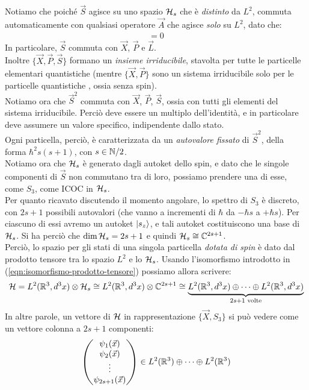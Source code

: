 \documentclass[../../FisicaTeorica.tex]{subfiles}
\begin{document}
Notiamo che poiché $\vec{S}$ agisce su uno spazio $\mathcal{H}_s$ che è \textit{distinto} da $L^2$, commuta automaticamente con qualsiasi operatore $\vec{A}$ che agisce \textit{solo} su $L^2$, dato che:
\begin{align*}
[\vec{A} \otimes \bb{I}, \bb{I}\otimes \vec{S}]=0
\end{align*}
In particolare, $\vec{S}$ commuta con $\vec{X}$, $\vec{P}$ e $\vec{L}$.\\
Inoltre $\{\vec{X}, \vec{P}, \vec{S}\}$ formano un \textit{insieme irriducibile}, stavolta per tutte le particelle elementari quantistiche (mentre $\{\vec{X},\vec{P}\}$ sono un sistema irriducibile solo per le particelle quantistiche , ossia senza spin).\\
Notiamo ora che $\vec{S}^2$ commuta con $\vec{X}$, $\vec{P}$, $\vec{S}$, ossia con tutti gli elementi del sistema irriducibile. Perciò deve essere un multiplo dell'identità, e in particolare deve assumere un valore specifico, indipendente dallo stato.\\
Ogni particella, perciò, è caratterizzata da un \textit{autovalore fissato} di $\vec{S}^2$, della forma $\hbar^2 s(s+1)$, con $s\in \mathbb{N}/2$.\\
Notiamo ora che $\mathcal{H}_s$ è generato dagli autoket dello spin, e dato che le singole componenti di $\vec{S}$ non commutano tra di loro, possiamo prendere una di esse, come $S_3$, come ICOC in $\mathcal{H}_s$.\\
Per quanto ricavato discutendo il momento angolare, lo spettro di $S_3$ è discreto, con $2s +1$ possibili autovalori (che vanno a incrementi di $\hbar$ da $-\hbar s$ a $+\hbar s$). Per ciascuno di essi avremo un autoket $\Ket{s_z}$, e tali autoket costituiscono una base di $\mathcal{H}_s$. Si ha perciò che $\operatorname{dim}\mathcal{H}_s = 2s+1$ e quindi $\mathcal{H}_s \cong \mathbb{C}^{2s+1}$.\\

Perciò, lo spazio  per gli stati di una singola particella \textit{dotata di spin} è dato dal prodotto tensore tra lo spazio  $L^2$ e lo  $\mathcal{H}_s$. Usando l'isomorfismo introdotto in (\ref{eqn:isomorfismo-prodotto-tensore}) possiamo allora scrivere:
\[
\mathcal{H} = L^2(\mathbb{R}^3, d^3x) \otimes \mathcal{H}_s \cong L^2(\mathbb{R}^3, d^3 x)\otimes \mathbb{C}^{2s+1} \cong \underbrace{L^2(\mathbb{R}^3, d^3x) \oplus \dots \oplus L^2(\mathbb{R}^3, d^3x)}_{2s+1 \text{ volte}}
\]
In altre parole, un vettore di $\mathcal{H}$ in rappresentazione $\{\vec{X}, S_3\}$ si può vedere come un vettore colonna a $2s+1$ componenti:
\[
\begin{pmatrix}
\psi_1(\vec{x})\\
\psi_2(\vec{x})\\
\vdots\\
\psi_{2s+1}(\vec{x})
\end{pmatrix} \in L^2(\mathbb{R}^3) \oplus \dots \oplus L^2(\mathbb{R}^3)
\]
\end{document}

